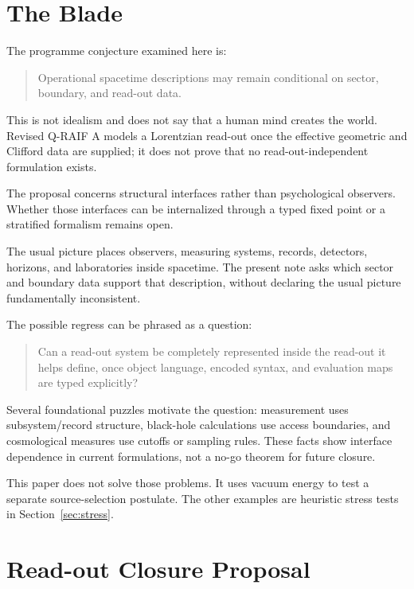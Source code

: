 \documentclass[12pt,a4paper]{article}
\theoremstyle{definition}
\theoremstyle{remark}
\begin{document}
\clearpage
\tableofcontents
\clearpage

\section{The Blade}
\label{sec:blade}

The programme conjecture examined here is:

\begin{quote}
Operational spacetime descriptions may remain conditional on sector, boundary, and read-out data.
\end{quote}

This is not idealism and does not say that a human mind creates the world.  Revised Q-RAIF A models a Lorentzian read-out once the effective geometric and Clifford data are supplied; it does not prove that no read-out-independent formulation exists.

The proposal concerns structural interfaces rather than psychological observers.  Whether those interfaces can be internalized through a typed fixed point or a stratified formalism remains open.

The usual picture places observers, measuring systems, records, detectors, horizons, and laboratories inside spacetime.  The present note asks which sector and boundary data support that description, without declaring the usual picture fundamentally inconsistent.

The possible regress can be phrased as a question:

\begin{quote}
Can a read-out system be completely represented inside the read-out it helps define, once object language, encoded syntax, and evaluation maps are typed explicitly?
\end{quote}

Several foundational puzzles motivate the question: measurement uses subsystem/record structure, black-hole calculations use access boundaries, and cosmological measures use cutoffs or sampling rules.  These facts show interface dependence in current formulations, not a no-go theorem for future closure.

This paper does not solve those problems. It uses vacuum energy to test a separate source-selection postulate. The other examples are heuristic stress tests in Section~\ref{sec:stress}.

\section{Read-out Closure Proposal}
\label{sec:criterion}
\end{document}
